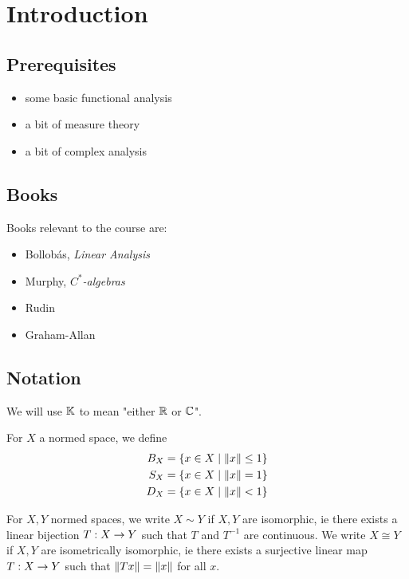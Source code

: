 \documentclass{article}
\begin{document}
\maketitle

\tableofcontents

\clearpage

\section{Introduction}

\subsection*{Prerequisites}

\begin{itemize}
  \item some basic functional analysis
  \item a bit of measure theory
  \item a bit of complex analysis
\end{itemize}

\subsection*{Books}

Books relevant to the course are:
\begin{itemize}
  \item Bollob\'as, \textit{Linear Analysis}
  \item Murphy, \textit{$C^*$-algebras}
  \item Rudin
  \item Graham-Allan
\end{itemize}

\subsection*{Notation}

We will use $\mathbb K$ to mean "either $\mathbb R$ or $\mathbb C$".

For $X$ a normed space, we define
\begin{align*}
  B_X & = \{x \in X \mid \left\lVert x\right\rVert \le 1\} \\
  S_X & = \{x \in X \mid \left\lVert x\right\rVert = 1\} \\
  D_X & = \{x \in X \mid \left\lVert x\right\rVert < 1\}
\end{align*}

For $X, Y$ normed spaces, we write $X \sim Y$ if $X, Y$ are isomorphic, ie there
exists a linear bijection $T : X \rightarrow Y$ such that $T$ and $T^{-1}$ are continuous. We write $X \cong Y$ if $X, Y$ are isometrically isomorphic, ie there exists a surjective linear map $T : X \rightarrow Y$ such that $\left\lVert T x\right\rVert = \left\lVert x\right\rVert$ for all $x$.
\end{document}
